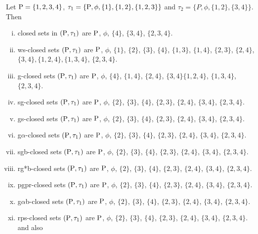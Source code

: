 \begin{exm}\label{exm2.2.19}
Let $\mathrm{P} = \{1, 2, 3, 4\}$, $\tau_{1} =\{\mathrm{P}, \phi, \{1\}, \{1, 2\},\{1, 2, 3\}\}$ and $\tau_{2} =\{ P, \phi, \{1, 2\},\{3, 4\}\}$. Then
\begin{enumerate}[(i)]
\item closed sets in $(\mathrm{P}, \tau_{1})$ are $\mathrm{P}$, $\phi$, $\{4\}$, $\{3, 4\}$, $\{2, 3, 4\}$.

\item ws-closed sets $(\mathrm{P}, \tau_{1})$ are $\mathrm{P}$, $\phi$, $\{1\}$, $\{2\}$, $\{3\}$, $\{4\}$, $\{1, 3\}$, $\{1, 4\}$, $\{2, 3\}$, $\{2, 4\}$, $\{3, 4\}, \{1, 2, 4\}, \{1, 3, 4\}$, $\{2, 3, 4\}$.

\item g-closed sets $(\mathrm{P}, \tau_{1})$ are $\mathrm{P}$, $\phi$, $\{4\}$, $\{1, 4\}$, $\{2, 4\}$, $\{3, 4\}\{1, 2, 4\}$, $\{1, 3, 4\}$, $\{2, 3, 4\}$.

\item sg-closed sets $(\mathrm{P}, \tau_{1})$ are $\mathrm{P}$, $\phi$, $\{2\}$, $\{3\}$, $\{4\}$, $\{2, 3\}$, $\{2, 4\}$, $\{3, 4\}$, $\{2, 3, 4\}$.

\item gs-closed sets $(\mathrm{P}, \tau_{1})$ are $\mathrm{P}$, $\phi$, $\{2\}$, $\{3\}$, $\{4\}$, $\{2, 3\}$, $\{2, 4\}$, $\{3, 4\}$, $\{2, 3, 4\}$.

\item g$\alpha$-closed sets $(\mathrm{P}, \tau_{1})$ are $\mathrm{P}$, $\phi$, $\{2\}$, $\{3\}$, $\{4\}$, $\{2, 3\}$, $\{2, 4\}$, $\{3, 4\}$, $\{2, 3, 4\}$.

\item sgb-closed sets $(\mathrm{P}, \tau_{1})$ are $\mathrm{P}$, $\phi$, $\{2\}$, $\{3\}$, $\{4\}$, $\{2, 3\}$, $\{2, 4\}$, $\{3, 4\}$, $\{2, 3, 4\}$.

\item rg*b-closed sets $(\mathrm{P}, \tau_{1})$ are $\mathrm{P}$, $\phi$, $\{2\}$, $\{3\}$, $\{4\}$, $\{2, 3\}$, $\{2, 4\}$, $\{3, 4\}$, $\{2, 3, 4\}$.

\item pgpr-closed sets $(\mathrm{P}, \tau_{1})$ are $\mathrm{P}$, $\phi$, $\{2\}$, $\{3\}$, $\{4\}$, $\{2, 3\}$, $\{2, 4\}$, $\{3, 4\}$, $\{2, 3, 4\}$.

\item g$\alpha$b-closed sets $(\mathrm{P}, \tau_{1})$ are $\mathrm{P}$, $\phi$, $\{2\}$, $\{3\}$, $\{4\}$, $\{2, 3\}$, $\{2, 4\}$, $\{3, 4\}$, $\{2, 3, 4\}$.

\item rps-closed sets $(\mathrm{P}, \tau_{1})$ are $\mathrm{P}$, $\phi$, $\{2\}$, $\{3\}$, $\{4\}$, $\{2, 3\}$, $\{2, 4\}$, $\{3, 4\}$, $\{2, 3, 4\}$. and also
\end{enumerate}


\end{exm}
